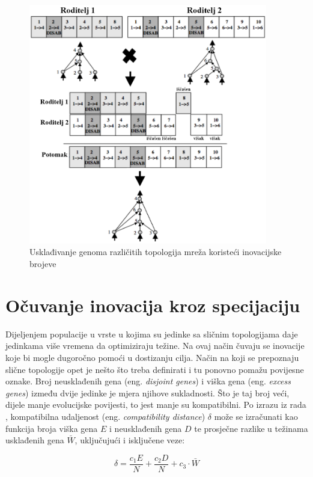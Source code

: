 \documentclass[times, utf8, diplomski, numeric]{fer}
\begin{document}
\begin{figure}
  \centering
  \includegraphics[height=10.5cm]{slika6}
  \caption{Usklađivanje genoma različitih topologija mreža koristeći inovacijske brojeve \citep{rad2}}
  \label{slika6}
\end{figure}

\section{Očuvanje inovacija kroz specijaciju}
Dijeljenjem populacije u vrste u kojima su jedinke sa sličnim topologijama daje jedinkama više vremena da optimiziraju težine. Na ovaj način čuvaju se inovacije koje bi mogle dugoročno pomoći u dostizanju cilja. Način na koji se prepoznaju slične topologije opet je nešto što treba definirati i tu ponovno pomažu povijesne oznake. Broj neusklađenih gena (eng. \textit{disjoint genes}) i viška gena (eng. \textit{excess genes}) između dvije jedinke je mjera njihove sukladnosti. Što je taj broj veći, dijele manje evolucijske povijesti, to jest manje su kompatibilni. Po izrazu iz rada \citep {rad5}, kompatibilna udaljenost (eng. \textit{compatibility distance}) $\delta$ može se izračunati kao funkcija broja viška gena $E$ i neusklađenih gena $D$ te prosječne razlike u težinama usklađenih gena $\bar{W}$, uključujući i isključene veze:

\begin{equation}
\delta = \frac{c_1E}{N} + \frac{c_2D}{N} + c_3\cdot\bar{W}
\label{jednakost1}
\end{equation}
\end{document}
